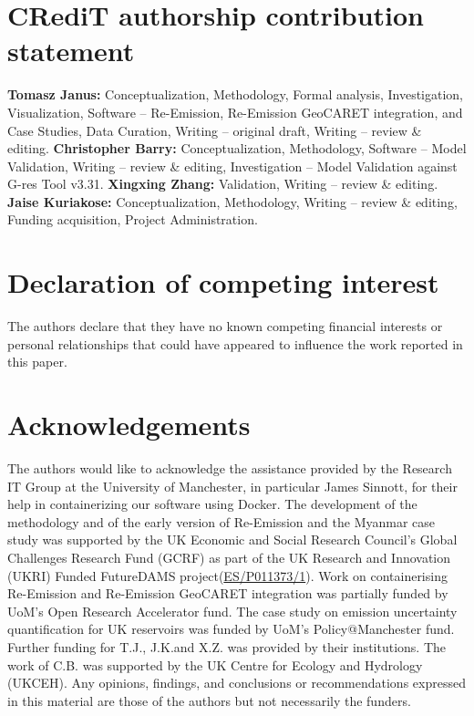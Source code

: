 \documentclass[review, authoryear, 1p]{elsarticle} %
\begin{document}
\section{CRediT authorship contribution statement}
\textbf{Tomasz Janus:} Conceptualization, Methodology, Formal analysis, Investigation, Visualization, Software -- Re-Emission, Re-Emission GeoCARET integration, and Case Studies, Data Curation, Writing -- original draft, Writing -- review \& editing.
\textbf{Christopher Barry:} Conceptualization, Methodology, Software -- Model Validation, Writing -- review \& editing, Investigation -- Model Validation against G-res Tool v3.31.
\textbf{Xingxing Zhang:} Validation, Writing -- review \& editing.
\textbf{Jaise Kuriakose:} Conceptualization, Methodology, Writing -- review \& editing, Funding acquisition, Project Administration.

\section{Declaration of competing interest}
The authors declare that they have no known competing financial interests or personal relationships that could have appeared to influence the work reported in this paper.

\section{Acknowledgements}
The authors would like to acknowledge the assistance provided by the Research IT Group at the University of Manchester, in particular James Sinnott, for their help in containerizing our software using Docker.
The development of the methodology and of the early version of Re-Emission and the Myanmar case study was supported by the UK Economic and Social Research Council's Global Challenges Research Fund (GCRF) as part of the UK Research and Innovation (UKRI) Funded FutureDAMS project(\href{www.futuredams.org}{ES/P011373/1}).
Work on containerising Re-Emission and Re-Emission GeoCARET integration was partially funded by UoM's Open Research Accelerator fund.
The case study on emission uncertainty quantification for UK reservoirs was funded by UoM's Policy@Manchester fund.
Further funding for T.J., J.K.and X.Z. was provided by their institutions. 
The work of C.B. was supported by the UK Centre for Ecology and Hydrology (UKCEH). 
Any opinions, findings, and conclusions or recommendations expressed in this material are those of the authors but not necessarily the funders.
\end{document}
